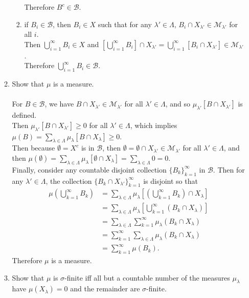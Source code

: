 \begin{enumerate}
\begin{enumerate}[label=(\roman*),align=left]
\begin{enumerate}[label=(\roman*),align=left]
\[			\]
			Therefore $B^c\in\mathcal{B}$.
			\item if $B_i\in\mathcal{B}$, then $B_i\in X$ such that for any $\lambda'\in\Lambda$, $B_i\cap X_{\lambda'}\in\mathcal{M}_{\lambda'}$ for all $i$.\\
			Then $\bigcup_{i=1}^\infty B_i\in X$ and $[\bigcup_{i=1}^\infty B_i]\cap X_{\lambda'} =\bigcup_{i=1}^\infty [B_i\cap X_{\lambda'}]\in\mathcal{M}_{\lambda'}$.
			\\Therefore $\bigcup_{i=1}^\infty B_i\in\mathcal{B}$.
		\end{enumerate}
		\item Show that $\mu$ is a measure.\\
		\\For $B\in\mathcal{B}$, we have $B\cap X_{\lambda'}\in\mathcal{M}_{\lambda'}$ for all $\lambda'\in\Lambda$, and so $\mu_{\lambda'}[B\cap X_{\lambda'}]$ is defined.
		\\Then $\mu_{\lambda'}[B\cap X_{\lambda'}]\ge0$ for all $\lambda'\in\Lambda$, which implies $\mu(B)=\sum_{\lambda\in\Lambda}\mu_\lambda[B\cap X_\lambda]\ge0$.
		\\Then because $\emptyset=X^c$ is in $\mathcal{B}$, then $\emptyset=\emptyset\cap X_{\lambda'}\in\mathcal{M}_{\lambda'}$ for all $\lambda'\in\Lambda$, and then $\mu(\emptyset)=\sum_{\lambda\in\Lambda}\mu_\lambda[\emptyset\cap X_\lambda]=\sum_{\lambda\in\Lambda}0=0$.
		\\Finally, consider any countable disjoint collection $\{B_k\}_{k=1}^\infty$ in $\mathcal{B}$.
		Then for any $\lambda'\in\Lambda$, the collection $\{B_k\cap X_{\lambda'}\}_{k=1}^\infty$ is disjoint so that 
		\begin{align*}
			\mu(\bigcup_{k=1}^\infty B_k)&= \sum_{\lambda\in\Lambda}\mu_\lambda[(\bigcup_{k=1}^\infty B_k)\cap X_\lambda]\\
			&=\sum_{\lambda\in\Lambda}\mu_\lambda[\bigcup_{k=1}^\infty (B_k\cap X_\lambda)]\\
			&=\sum_{\lambda\in\Lambda}\sum_{k=1}^\infty \mu_\lambda(B_k\cap X_\lambda)\\
			&=\sum_{k=1}^\infty \sum_{\lambda\in\Lambda} \mu_\lambda(B_k\cap X_\lambda)\\
			&=\sum_{k=1}^\infty \mu(B_k).
		\end{align*}
		Therefore $\mu$ is a measure.
		\item Show that $\mu$ is $\sigma$-finite iff all but a countable number of the measures $\mu_\lambda$ have $\mu(X_\lambda)=0$ and the remainder are $\sigma$-finite.\\

\end{enumerate}
\end{enumerate}

